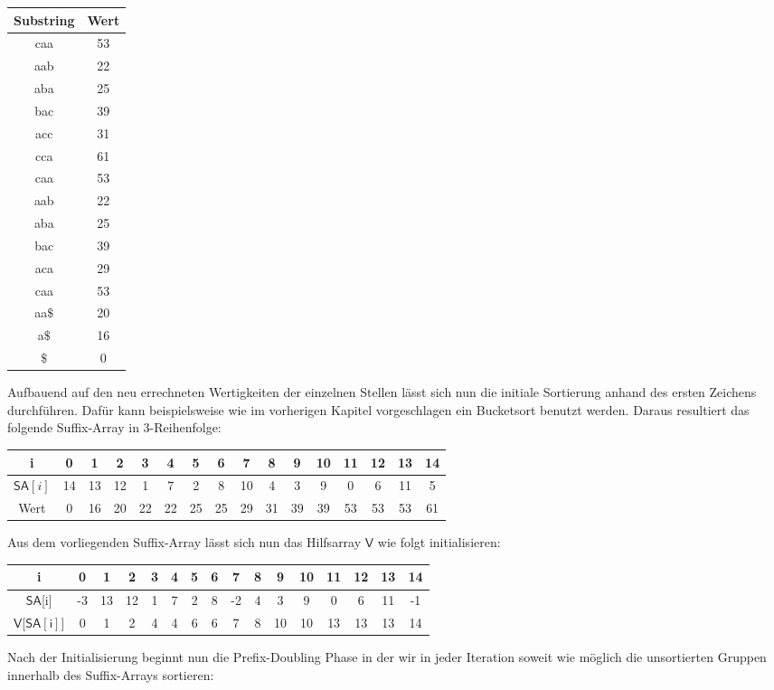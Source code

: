 \begin{center}
\begin{tabular}{c | c}
Substring & Wert \\
\hline
caa & 53 \\
aab & 22 \\
aba & 25 \\
bac & 39 \\
acc & 31 \\
cca & 61 \\
caa & 53 \\
aab & 22 \\
aba & 25 \\
bac & 39 \\
aca & 29 \\
caa & 53 \\
aa$\$$ & 20 \\
a$\$$ & 16 \\
$\$$ & 0 
\end{tabular}
\end{center}

Aufbauend auf den neu errechneten Wertigkeiten der einzelnen Stellen lässt sich nun die initiale Sortierung anhand des ersten Zeichens durchführen. Dafür kann beispielsweise wie im vorherigen Kapitel vorgeschlagen ein Bucketsort benutzt werden. Daraus resultiert das folgende Suffix-Array in 3-Reihenfolge:\\
\begin{center}
\begin{tabular}{| c | c | c | c | c | c | c | c | c | c | c | c | c | c | c | c |}
\hline
i & 0 & 1 &2 &3 &4 &5 &6 &7 &8 &9 &10 &11 &12 &13 &14 \\
\hline
$\mathsf{SA}[i]$ & 14 & 13 &12 &1 &7 & 2 &8 &10 &4 &3 &9 &0 &6 &11 &5 \\
\hline
Wert & 0 & 16 &20 &22 &22 &25 &25 &29 &31 &39 &39 &53 &53 &53 &61 \\
\hline
\end{tabular}
\end{center}
Aus dem vorliegenden Suffix-Array lässt sich nun das Hilfsarray $\mathsf{V}$ wie folgt initialisieren:\\
\begin{center}
\begin{tabular}{| c | c | c | c | c | c | c | c | c | c | c | c | c | c | c | c |}
\hline
i & 0 & 1 &2 &3 &4 &5 &6 &7 &8 &9 &10 &11 &12 &13 &14 \\
\hline
$\mathsf{SA}$[i] & -3 & 13 &12 &1 &7 & 2 &8 &-2 &4 &3 &9 &0 &6 &11 &-1 \\

$\mathsf{V}$[$\mathsf{SA[i]}$] & 0 & 1 & 2 & 4 & 4 & 6 & 6 & 7 & 8 & 10 & 10 & 13 & 13 & 13 & 14 \\
\hline
\end{tabular}
\end{center}
Nach der Initialisierung beginnt nun die Prefix-Doubling Phase in der wir in jeder Iteration soweit wie möglich die unsortierten Gruppen innerhalb des Suffix-Arrays sortieren:

